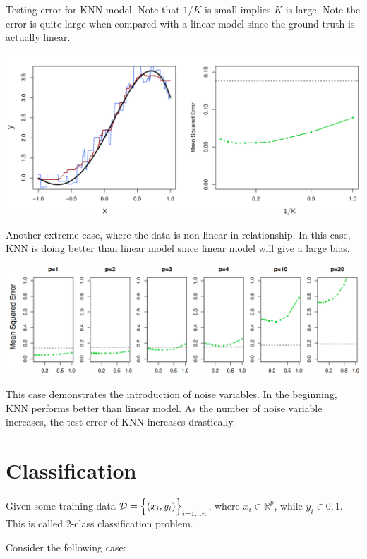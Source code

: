 \documentclass{article}
\theoremstyle{MyNonumberplain}
\theoremstyle{break}
\theoremstyle{break}
\theoremstyle{break}
\theoremstyle{break}
\begin{document}
Testing error for KNN model. Note that $1/K$ is small implies $K$ is large. Note the error is quite large when compared
with a linear model since the ground truth is actually linear.

\begin{center}
    \includegraphics*[scale=0.2]{Images/img17.png}
\end{center}

Another extreme case, where the data is non-linear in relationship. In this case, KNN is doing better than linear model since linear model
will give a large bias.

\begin{center}
    \includegraphics*[scale=0.2]{Images/img18.png}
\end{center}

This case demonstrates the introduction of noise variables. In the beginning, KNN performs
better than linear model. As the number of noise variable increases, the test error of KNN increases drastically. 

\section{Classification}

Given some training data $\mathcal{D}=\Bigl\{(x_i,y_i)\Bigr\}_{i=1...n}$, where $x_i\in\mathbb{R}^p$, while $y_i\in{0,1}$.
This is called 2-class classification problem.

Consider the following case:
\end{document}
